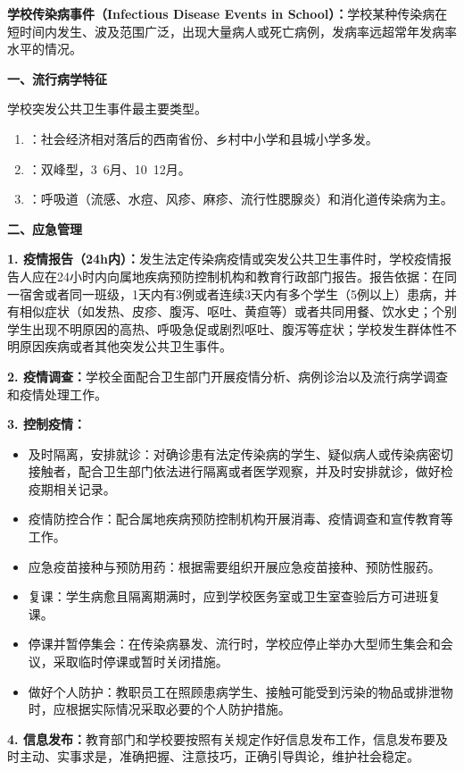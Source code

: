\begin{keybox}
\textbf{学校传染病事件（Infectious Disease Events in School）：}学校某种传染病在短时间内发生、波及范围广泛，出现大量病人或死亡病例，发病率远超常年发病率水平的情况。

\textbf{一、流行病学特征}

学校突发公共卫生事件最主要类型。

\begin{enumerate}[leftmargin=*]
    \item {}：社会经济相对落后的西南省份、乡村中小学和县城小学多发。
    \item {}：双峰型，3~6月、10~12月。
    \item {}：呼吸道（流感、水痘、风疹、麻疹、流行性腮腺炎）和消化道传染病为主。
\end{enumerate}
\textbf{二、应急管理}

\textbf{1. 疫情报告（24h内）：}发生法定传染病疫情或突发公共卫生事件时，学校疫情报告人应在24小时内向属地疾病预防控制机构和教育行政部门报告。报告依据：在同一宿舍或者同一班级，1天内有3例或者连续3天内有多个学生（5例以上）患病，并有相似症状（如发热、皮疹、腹泻、呕吐、黄疸等）或者共同用餐、饮水史；个别学生出现不明原因的高热、呼吸急促或剧烈呕吐、腹泻等症状；学校发生群体性不明原因疾病或者其他突发公共卫生事件。

\textbf{2. 疫情调查：}学校全面配合卫生部门开展疫情分析、病例诊治以及流行病学调查和疫情处理工作。

\textbf{3. 控制疫情：}
\begin{itemize}[leftmargin=*]
    \item 及时隔离，安排就诊：对确诊患有法定传染病的学生、疑似病人或传染病密切接触者，配合卫生部门依法进行隔离或者医学观察，并及时安排就诊，做好检疫期相关记录。
    \item 疫情防控合作：配合属地疾病预防控制机构开展消毒、疫情调查和宣传教育等工作。
    \item 应急疫苗接种与预防用药：根据需要组织开展应急疫苗接种、预防性服药。
    \item 复课：学生病愈且隔离期满时，应到学校医务室或卫生室查验后方可进班复课。
    \item 停课并暂停集会：在传染病暴发、流行时，学校应停止举办大型师生集会和会议，采取临时停课或暂时关闭措施。
    \item 做好个人防护：教职员工在照顾患病学生、接触可能受到污染的物品或排泄物时，应根据实际情况采取必要的个人防护措施。
\end{itemize}

\textbf{4. 信息发布：}教育部门和学校要按照有关规定作好信息发布工作，信息发布要及时主动、实事求是，准确把握、注意技巧，正确引导舆论，维护社会稳定。


\end{keybox}
